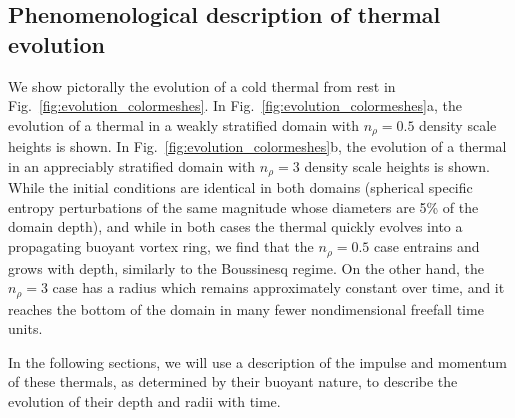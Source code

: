 \documentclass[twocolumn, amsmath, amsfonts, amssymb, trackchanges]{aastex62}
\begin{document}
\subsection{Phenomenological description of thermal evolution}
We show pictorally the evolution of a cold thermal from rest in Fig.~\ref{fig:evolution_colormeshes}. 
In Fig.~\ref{fig:evolution_colormeshes}a, the evolution of a thermal in a weakly stratified domain with $n_\rho = 0.5$ density scale heights is shown. 
In Fig.~\ref{fig:evolution_colormeshes}b, the evolution of a thermal in an appreciably stratified domain with $n_\rho = 3$ density scale heights is shown. 
While the initial conditions are identical in both domains (spherical specific entropy perturbations of the same magnitude whose diameters are 5\% of the domain depth), and while in both cases the thermal quickly evolves into a propagating buoyant vortex ring, we find that the $n_\rho = 0.5$ case entrains and grows with depth, similarly to the Boussinesq regime.
On the other hand, the $n_\rho = 3$ case has a radius which remains approximately constant over time, and it reaches the bottom of the domain in many fewer nondimensional freefall time units.

In the following sections, we will use a description of the impulse and momentum of these thermals, as determined by their buoyant nature, to describe the evolution of their depth and radii with time.
\end{document}

